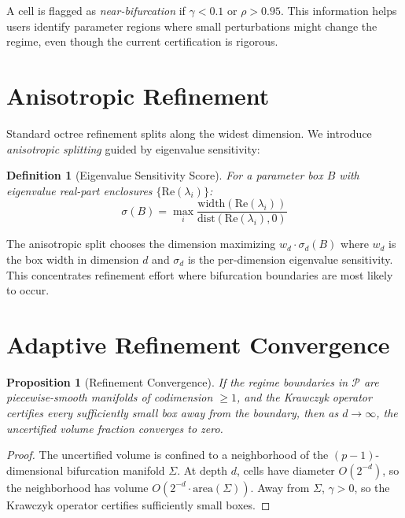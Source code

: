 \documentclass[11pt]{article}
\newtheorem{proposition}[theorem]{Proposition}
\newtheorem{definition}[theorem]{Definition}
\begin{document}
A cell is flagged as \emph{near-bifurcation} if $\gamma < 0.1$ or $\rho > 0.95$.
This information helps users identify parameter regions where small perturbations might change the regime, even though the current certification is rigorous.

\section{Anisotropic Refinement}
\label{sec:anisotropic}

Standard octree refinement splits along the widest dimension.
We introduce \emph{anisotropic splitting} guided by eigenvalue sensitivity:

\begin{definition}[Eigenvalue Sensitivity Score]
For a parameter box $B$ with eigenvalue real-part enclosures $\{\mathrm{Re}(\lambda_i)\}$:
\[
\sigma(B) = \max_i \frac{\mathrm{width}(\mathrm{Re}(\lambda_i))}{\mathrm{dist}(\mathrm{Re}(\lambda_i), 0)}
\]
\end{definition}

The anisotropic split chooses the dimension maximizing $w_d \cdot \sigma_d(B)$ where $w_d$ is the box width in dimension $d$ and $\sigma_d$ is the per-dimension eigenvalue sensitivity.
This concentrates refinement effort where bifurcation boundaries are most likely to occur.

\section{Adaptive Refinement Convergence}
\label{sec:convergence}

\begin{proposition}[Refinement Convergence]
\label{prop:convergence}
If the regime boundaries in $\mathcal{P}$ are piecewise-smooth manifolds of codimension $\geq 1$, and the Krawczyk operator certifies every sufficiently small box away from the boundary, then as $d \to \infty$, the uncertified volume fraction converges to zero.
\end{proposition}

\begin{proof}
The uncertified volume is confined to a neighborhood of the $(p{-}1)$-dimensional bifurcation manifold $\Sigma$.
At depth $d$, cells have diameter $O(2^{-d})$, so the neighborhood has volume $O(2^{-d} \cdot \mathrm{area}(\Sigma))$.
Away from $\Sigma$, $\gamma > 0$, so the Krawczyk operator certifies sufficiently small boxes.
\end{proof}
\end{document}
